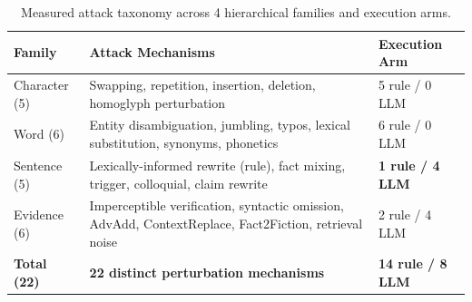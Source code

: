 
\begin{table}[t]
\centering
\small
\caption{Measured attack taxonomy across 4 hierarchical families and execution arms.}
\label{tab:attack_taxonomy}
\begin{tabular}{lll}
\toprule
\textbf{Family} & \textbf{Attack Mechanisms} & \textbf{Execution Arm} \\
\midrule
Character (5) & Swapping, repetition, insertion, deletion, homoglyph perturbation & 5 rule / 0 LLM \\
Word (6) & Entity disambiguation, jumbling, typos, lexical substitution, synonyms, phonetics & 6 rule / 0 LLM \\
Sentence (5) & Lexically-informed rewrite (rule), fact mixing, trigger, colloquial, claim rewrite & \textbf{1 rule / 4 LLM} \\
Evidence (6) & Imperceptible verification, syntactic omission, AdvAdd, ContextReplace, Fact2Fiction, retrieval noise & 2 rule / 4 LLM \\
\midrule
\textbf{Total (22)} & \textbf{22 distinct perturbation mechanisms} & \textbf{14 rule / 8 LLM} \\
\bottomrule
\end{tabular}
\end{table}

